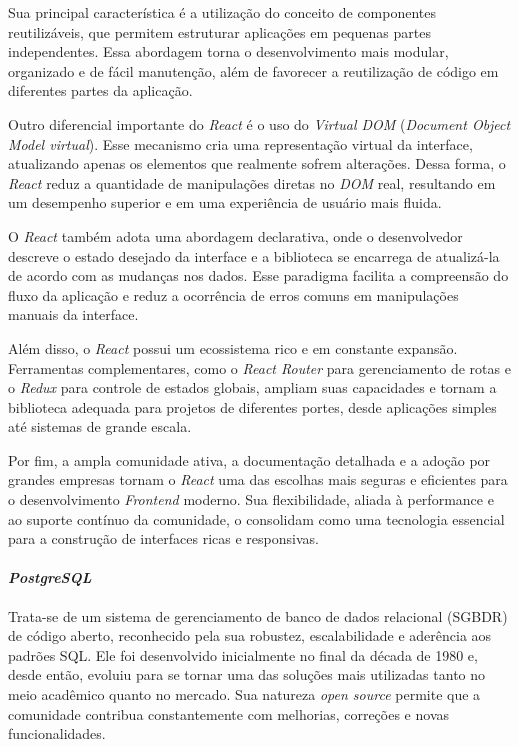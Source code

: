 \documentclass[english,brazilian]{UNISINOSartigo} %
\begin{document}
Sua principal característica é a utilização do conceito de componentes reutilizáveis, que permitem estruturar aplicações em pequenas partes independentes. Essa abordagem torna o desenvolvimento mais modular, organizado e de fácil manutenção, além de favorecer a reutilização de código em diferentes partes da aplicação.

Outro diferencial importante do \textit{React} é o uso do \textit{Virtual DOM} (\textit{Document Object Model virtual}). Esse mecanismo cria uma representação virtual da interface, atualizando apenas os elementos que realmente sofrem alterações. Dessa forma, o \textit{React} reduz a quantidade de manipulações diretas no \textit{DOM} real, resultando em um desempenho superior e em uma experiência de usuário mais fluida.

O \textit{React} também adota uma abordagem declarativa, onde o desenvolvedor descreve o estado desejado da interface e a biblioteca se encarrega de atualizá-la de acordo com as mudanças nos dados. Esse paradigma facilita a compreensão do fluxo da aplicação e reduz a ocorrência de erros comuns em manipulações manuais da interface.

Além disso, o \textit{React} possui um ecossistema rico e em constante expansão. Ferramentas complementares, como o \textit{React Router} para gerenciamento de rotas e o \textit{Redux} para controle de estados globais, ampliam suas capacidades e tornam a biblioteca adequada para projetos de diferentes portes, desde aplicações simples até sistemas de grande escala.

Por fim, a ampla comunidade ativa, a documentação detalhada e a adoção por grandes empresas tornam o \textit{React} uma das escolhas mais seguras e eficientes para o desenvolvimento \textit{Frontend} moderno. Sua flexibilidade, aliada à performance e ao suporte contínuo da comunidade, o consolidam como uma tecnologia essencial para a construção de interfaces ricas e responsivas.

\paragraph{\textit{PostgreSQL}}

Trata-se de um sistema de gerenciamento de banco de dados relacional (SGBDR) de código aberto, reconhecido pela sua robustez, escalabilidade e aderência aos padrões SQL. Ele foi desenvolvido inicialmente no final da década de 1980 e, desde então, evoluiu para se tornar uma das soluções mais utilizadas tanto no meio acadêmico quanto no mercado. Sua natureza \textit{open source} permite que a comunidade contribua constantemente com melhorias, correções e novas funcionalidades.
\end{document}

